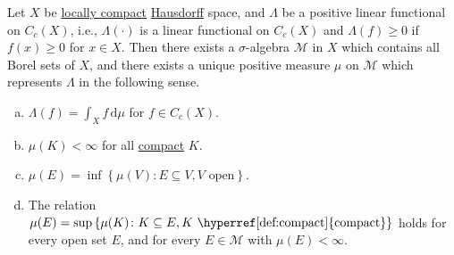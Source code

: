 \begin{theorem}\label{thm:lec27}
	Let \(X\) be \hyperref[def:locally-compact]{locally compact} \hyperref[def:Hausdorff]{Hausdorff} space, and \(\Lambda \) be a positive linear functional on \(C_c(X)\), i.e., \(\Lambda (\cdot)\) is a linear functional on \(C_c(X)\) and \(\Lambda (f) \geq 0\) if \(f(x) \geq 0\) for \(x\in X\). Then there exists a \(\sigma \)-algebra \(\mathcal{M} \) in \(X\) which contains all Borel sets of \(X\), and there exists a unique positive measure \(\mu \) on \(\mathcal{M} \) which represents \(\Lambda \) in the following sense.
	\begin{enumerate}[(a)]
		\item \(\Lambda (f) = \int _X f\,\mathrm{d} \mu \) for \(f\in C_c(X)\).
		\item \(\mu (K) < \infty \) for all \hyperref[def:compact]{compact} \(K\).
		\item \(\mu (E) = \inf \left\{ \mu (V) \colon E \subseteq V, V\text{ open} \right\} \).
		\item The relation \(\mu (E) = \sup \left\{ \mu (K) \colon K \subseteq E, K \text{ \hyperref[def:compact]{compact}}  \right\} \) holds for every open set \(E\), and for every \(E \in \mathcal{M} \) with \(\mu (E) < \infty \).
	\end{enumerate}
\end{theorem}
